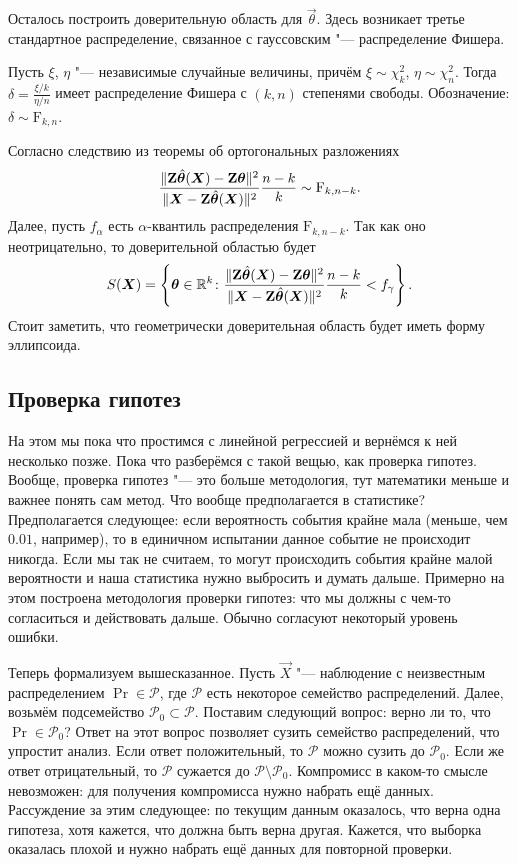 Осталось построить доверительную область для $\vec{\theta}$. Здесь возникает третье стандартное распределение, связанное с гауссовским "--- распределение Фишера. 
\begin{definition}
	Пусть $\xi$, $\eta$ "--- независимые случайные величины, причём $\xi \sim \chi^{2}_{k}$, $\eta \sim \chi^{2}_{n}$. Тогда $\delta = \frac{\xi/k}{\eta/n}$ имеет распределение Фишера с $(k, n)$ степенями свободы. Обозначение: $\delta \sim \mathrm{F}_{k, n}$.
\end{definition}
Согласно следствию из теоремы об ортогональных разложениях
\[
	\frac{\|\mathbf{Z}\hat{\bm{\theta}}(\bm{X}) - \mathbf{Z}\bm{\theta}\|^{2}}{\|\bm{X} - \mathbf{Z}\hat{\bm{\theta}}(\bm{X})\|^{2}}\frac{n - k}{k} \sim \mathrm{F}_{k, n - k}.
\]
Далее, пусть $f_{\alpha}$ есть $\alpha$-квантиль распределения $\mathrm{F}_{k, n - k}$. Так как оно неотрицательно, то доверительной областью будет
\[
	S(\bm{X}) = \left\{ \bm{\theta} \in \mathbb{R}^{k} \colon \frac{\|\mathbf{Z}\hat{\bm{\theta}}(\bm{X}) - \mathbf{Z}\bm{\theta}\|^{2}}{\|\bm{X} - \mathbf{Z}\hat{\bm{\theta}}(\bm{X})\|^{2}}\frac{n - k}{k} < f_{\gamma}\right\}.
\]
Стоит заметить, что геометрически доверительная область будет иметь форму эллипсоида.

\subsection{Проверка гипотез}
На этом мы пока что простимся с линейной регрессией и вернёмся к ней несколько позже. Пока что разберёмся с такой вещью, как проверка гипотез. Вообще, проверка гипотез "--- это больше методология, тут математики меньше и важнее понять сам метод. Что вообще предполагается в статистике? Предполагается следующее: если вероятность события крайне мала (меньше, чем $0.01$, например), то в единичном испытании данное событие не происходит никогда. Если мы так не считаем, то могут происходить события крайне малой вероятности и наша статистика нужно выбросить и думать дальше. Примерно на этом построена методология проверки гипотез: что мы должны с чем-то согласиться и действовать дальше. Обычно согласуют некоторый уровень ошибки.

Теперь формализуем вышесказанное. Пусть $\vec{X}$ "--- наблюдение с неизвестным распределением $\Pr \in \mathcal{P}$, где $\mathcal{P}$ есть некоторое семейство распределений. Далее, возьмём подсемейство $\mathcal{P}_{0} \subset \mathcal{P}$. Поставим следующий вопрос: верно ли то, что $\Pr \in \mathcal{P}_{0}$? Ответ на этот вопрос позволяет сузить семейство распределений, что упростит анализ. Если ответ положительный, то $\mathcal{P}$ можно сузить до $\mathcal{P}_{0}$. Если же ответ отрицательный, то $\mathcal{P}$ сужается до $\mathcal{P} \setminus \mathcal{P}_{0}$. Компромисс в каком-то смысле невозможен: для получения компромисса нужно набрать ещё данных. Рассуждение за этим следующее: по текущим данным оказалось, что верна одна гипотеза, хотя кажется, что должна быть верна другая. Кажется, что выборка оказалась плохой и нужно набрать ещё данных для повторной проверки.

